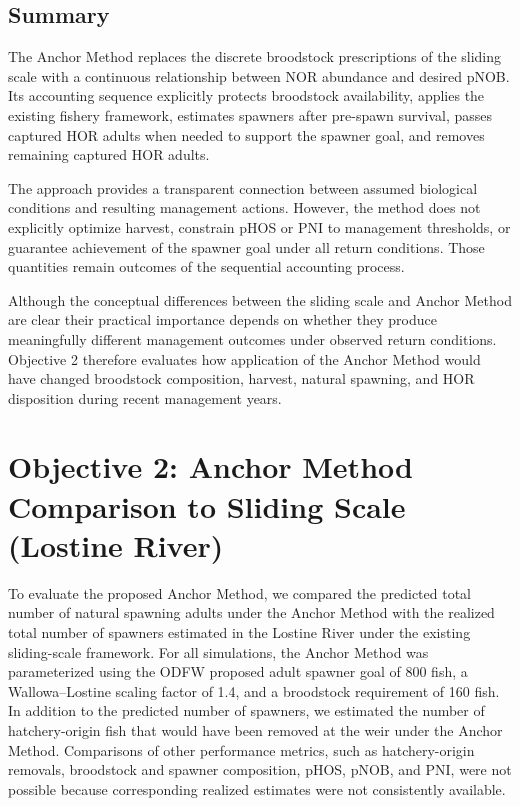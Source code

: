 \documentclass[12pt,letterpaper]{article}
\begin{document}
\subsection{Summary}\label{summary}

The Anchor Method replaces the discrete broodstock prescriptions of the sliding scale with a continuous relationship between NOR abundance and desired pNOB. Its accounting sequence explicitly protects broodstock availability, applies the existing fishery framework, estimates spawners after pre-spawn survival, passes captured HOR adults when needed to support the spawner goal, and removes remaining captured HOR adults.

The approach provides a transparent connection between assumed biological conditions and resulting management actions. However, the method does not explicitly optimize harvest, constrain pHOS or PNI to management thresholds, or guarantee achievement of the spawner goal under all return conditions. Those quantities remain outcomes of the sequential accounting process.

Although the conceptual differences between the sliding scale and Anchor Method are clear their practical importance depends on whether they produce meaningfully different management outcomes under observed return conditions. Objective 2 therefore evaluates how application of the Anchor Method would have changed broodstock composition, harvest, natural spawning, and HOR disposition during recent management years.

\section{Objective 2: Anchor Method Comparison to Sliding Scale (Lostine River)}\label{sec:obj2}

To evaluate the proposed Anchor Method, we compared the predicted total number of natural spawning adults under the Anchor Method with the realized total number of spawners estimated in the Lostine River under the existing sliding-scale framework. For all simulations, the Anchor Method was parameterized using the ODFW proposed adult spawner goal of 800 fish, a Wallowa--Lostine scaling factor of 1.4, and a broodstock requirement of 160 fish. In addition to the predicted number of spawners, we estimated the number of hatchery-origin fish that would have been removed at the weir under the Anchor Method. Comparisons of other performance metrics, such as hatchery-origin removals, broodstock and spawner composition, pHOS, pNOB, and PNI, were not possible because corresponding realized estimates were not consistently available.
\end{document}
